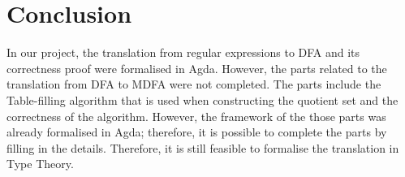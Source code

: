 \section{Conclusion}
\par In our project, the translation from regular expressions to DFA
and its correctness proof were formalised in Agda. However, the parts
related to the translation from DFA to MDFA were not completed. The
parts include the Table-filling algorithm that is used when
constructing the quotient set and the correctness of the
algorithm. However, the framework of the those parts was already formalised
in Agda; therefore, it is possible to complete the parts by filling in
the details. Therefore, it is still feasible to formalise the translation in
Type Theory. 